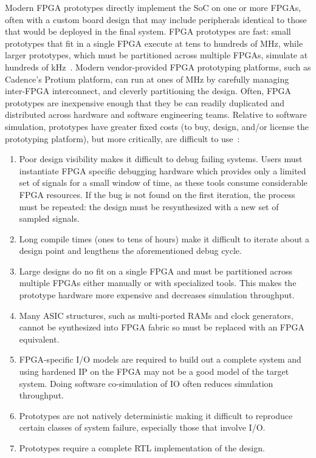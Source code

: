 Modern FPGA prototypes directly implement the SoC on one or more FPGAs, often
with a custom board design that may include peripherals identical to those that
would be deployed in the final system.  FPGA prototypes are fast: small
prototypes that fit in a single FPGA execute at tens to hundreds of MHz, while
larger prototypes, which must be partitioned across multiple FPGAs, simulate at
hundreds of kHz~\cite{nehalemprototype, atomprototype}. Modern vendor-provided
FPGA prototyping platforms, such as Cadence's Protium\cite{Protium} platform, can run at ones of MHz by
carefully managing inter-FPGA interconnect, and cleverly partitioning the
design. Often, FPGA prototypes are inexpensive enough that they be can readily
duplicated and distributed across hardware and software engineering teams.
Relative to software simulation, prototypes have greater fixed costs (to buy, design, and/or license the
prototyping platform), but more critically, are difficult to use~\cite{FPMM}:
\begin{enumerate}
    \item Poor design visibility makes it difficult to debug failing systems. Users must instantiate
        FPGA specific debugging hardware which provides only a limited set of
        signals for a small window of time, as these tools consume considerable
        FPGA resources.  If the bug is not found on the first iteration, the
        process must be repeated: the design must be resynthesized with a new
        set of sampled signals.

    \item Long compile times (ones to tens of hours) make it difficult to
        iterate about a design point and lengthens the aforementioned debug cycle.

    \item Large designs do no fit on a single FPGA and must be partitioned across multiple FPGAs either
        manually or with specialized tools. This makes the prototype hardware
        more expensive and decreases simulation throughput.

    \item Many ASIC structures, such as multi-ported RAMs and clock generators,
        cannot be synthesized into FPGA fabric so must be replaced with an FPGA
        equivalent.

    \item FPGA-specific I/O models are required to build out a complete system and using hardened
        IP on the FPGA may not be a good model of the target system. Doing software co-simulation of IO
        often reduces simulation throughput.

    \item Prototypes are not natively deterministic making it difficult to
        reproduce certain classes of system failure, especially those that
        involve I/O.

    \item Prototypes require a complete RTL implementation of the design.
\end{enumerate}

